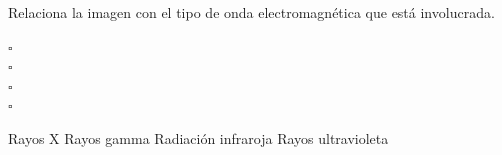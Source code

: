 Relaciona la imagen con  el tipo de onda electromagnética que está involucrada.
\begin{multicols}{2}
    \begin{flushright}
        $\square$\\
        $\square$\\
        $\square$\\
        $\square$\\
    \end{flushright}
    \vspace{1cm}
    \begin{checkboxes}
        \choice Rayos X                 \vspace{2cm}
        \choice Rayos gamma             \vspace{2cm}
        \choice Radiación infraroja     \vspace{2cm}
        \choice Rayos ultravioleta      \vspace{2cm}
    \end{checkboxes}
\end{multicols}